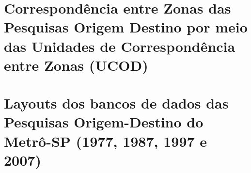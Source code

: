 %
%
%
%
%
%
%
%
%
%
%
%
%
\chapter{Correspondência entre Zonas das Pesquisas Origem Destino por meio das Unidades de Correspondência entre Zonas (UCOD)}\label{chap:anexo_ucod}



\chapter{Layouts dos bancos de dados das Pesquisas Origem-Destino do Metrô-SP (1977, 1987, 1997 e 2007)}\label{chap:anexo_layouts}




%



